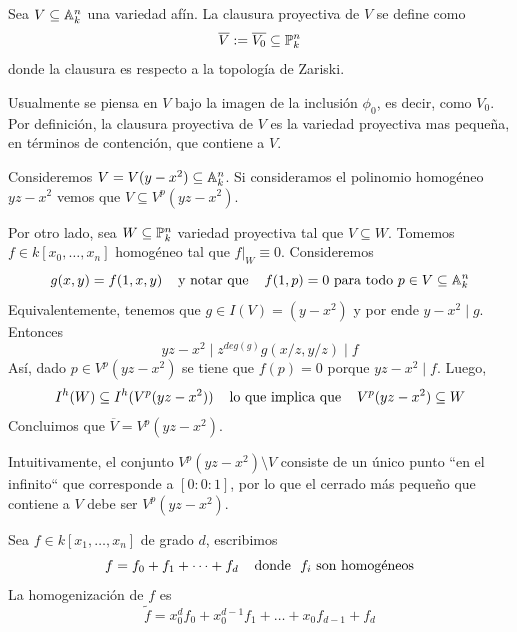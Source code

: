 \documentclass[11pt]{article}
\begin{document}
\begin{dfn}
    Sea $V\subseteq\A_{k}^{n}$ una variedad afín. La clausura proyectiva de $V$ se define como
    \begin{equation*}
        \overline{V}:=\overline{V_{0}}\subseteq\P_{k}^{n}
    \end{equation*}
    donde la clausura es respecto a la topología de Zariski.
\end{dfn}

\noindent Usualmente se piensa en $V$ bajo la imagen de la inclusión $\phi_{0}$, es decir, como 
$V_{0}$. Por definición, la clausura proyectiva de $V$ es la variedad proyectiva mas pequeña, en 
términos de contención, que contiene a $V$.

\begin{ejm}
    Consideremos $V=V(y-x^{2})\subseteq\A_{k}^{n}$. Si consideramos el polinomio homogéneo 
    $yz-x^{2}$ vemos que $V\subseteq V^{p}(yz-x^{2})$.

    \vspace{1mm}
    \noindent Por otro lado, sea $W\subseteq\P_{k}^{n}$ variedad proyectiva tal que 
    $V\subseteq W$. Tomemos $f\in k[x_{0},\dots,x_{n}]$ homogéneo tal que $f|_{W}\equiv0$. 
    Consideremos
    \begin{equation*}
        g(x,y)=f(1,x,y) \hhtext{y notar que} f(1,p)=0 \text{ para todo } p\in V\subseteq\A_{k}^{n}
    \end{equation*}
    Equivalentemente, tenemos que $g\in I(V)=(y-x^{2})$ y por ende $y-x^{2}\mid g$. Entonces
    \begin{equation*}
        yz-x^{2}\mid z^{deg(g)}g(x/z,y/z)\mid f
    \end{equation*}
    Así, dado $p\in V^{p}(yz-x^{2})$ se tiene que $f(p)=0$ porque $yz-x^{2}\mid f$. Luego,
    \begin{equation*}
        I^{h}(W)\subseteq I^{h}(V^{p}(yz-x^{2})) \hhtext{lo que implica que}
        V^{p}(yz-x^{2})\subseteq W
    \end{equation*}
    Concluimos que $\overline{V}=V^{p}(yz-x^{2})$.
\end{ejm}

\noindent Intuitivamente, el conjunto $V^{p}(yz-x^{2})\setminus V$ consiste de un único punto ``en 
el infinito`` que corresponde a $[0:0:1]$, por lo que el cerrado más pequeño que contiene a $V$ 
debe ser $V^{p}(yz-x^{2})$.

\begin{dfn}
    Sea $f\in k[x_{1},\dots,x_{n}]$ de grado $d$, escribimos
    \begin{equation*}
        f=f_{0}+f_{1}+\dots+f_{d} \htext{donde } f_{i} \text{ son homogéneos}
    \end{equation*}
    La homogenización de $f$ es
    \begin{equation*}
        \widetilde{f}=x_{0}^{d}f_{0}+x_{0}^{d-1}f_{1}+\dots+x_{0}f_{d-1}+f_{d}
    \end{equation*}
\end{dfn}
\end{document}
